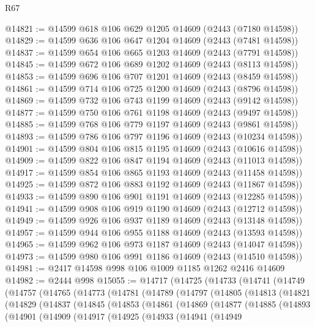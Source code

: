 \begin{lexlean}{R67}
\begin{coremodule}
@14821 := @14599 @618 @106 @629 @1205 @14609 (@2443 (@7180 @14598))
@14829 := @14599 @636 @106 @647 @1204 @14609 (@2443 (@7481 @14598))
@14837 := @14599 @654 @106 @665 @1203 @14609 (@2443 (@7791 @14598))
@14845 := @14599 @672 @106 @689 @1202 @14609 (@2443 (@8113 @14598))
@14853 := @14599 @696 @106 @707 @1201 @14609 (@2443 (@8459 @14598))
@14861 := @14599 @714 @106 @725 @1200 @14609 (@2443 (@8796 @14598))
@14869 := @14599 @732 @106 @743 @1199 @14609 (@2443 (@9142 @14598))
@14877 := @14599 @750 @106 @761 @1198 @14609 (@2443 (@9497 @14598))
@14885 := @14599 @768 @106 @779 @1197 @14609 (@2443 (@9861 @14598))
@14893 := @14599 @786 @106 @797 @1196 @14609 (@2443 (@10234 @14598))
@14901 := @14599 @804 @106 @815 @1195 @14609 (@2443 (@10616 @14598))
@14909 := @14599 @822 @106 @847 @1194 @14609 (@2443 (@11013 @14598))
@14917 := @14599 @854 @106 @865 @1193 @14609 (@2443 (@11458 @14598))
@14925 := @14599 @872 @106 @883 @1192 @14609 (@2443 (@11867 @14598))
@14933 := @14599 @890 @106 @901 @1191 @14609 (@2443 (@12285 @14598))
@14941 := @14599 @908 @106 @919 @1190 @14609 (@2443 (@12712 @14598))
@14949 := @14599 @926 @106 @937 @1189 @14609 (@2443 (@13148 @14598))
@14957 := @14599 @944 @106 @955 @1188 @14609 (@2443 (@13593 @14598))
@14965 := @14599 @962 @106 @973 @1187 @14609 (@2443 (@14047 @14598))
@14973 := @14599 @980 @106 @991 @1186 @14609 (@2443 (@14510 @14598))
@14981 := @2417 @14598 @998 @106 @1009 @1185 @1262 @2416 @14609
@14982 := @2444 @998
@15055 := @14717
    (@14725
      (@14733
        (@14741
          (@14749
            (@14757
              (@14765
                (@14773
                  (@14781
                    (@14789
                      (@14797
                        (@14805
                          (@14813
                            (@14821
                              (@14829
                                (@14837
                                  (@14845
                                    (@14853
                                      (@14861
                                        (@14869
                                          (@14877
                                            (@14885
                                              (@14893
                                                (@14901
                                                  (@14909
                                                    (@14917
                                                      (@14925
                                                        (@14933
                                                          (@14941
                                                            (@14949

\end{coremodule}
\end{lexlean}
